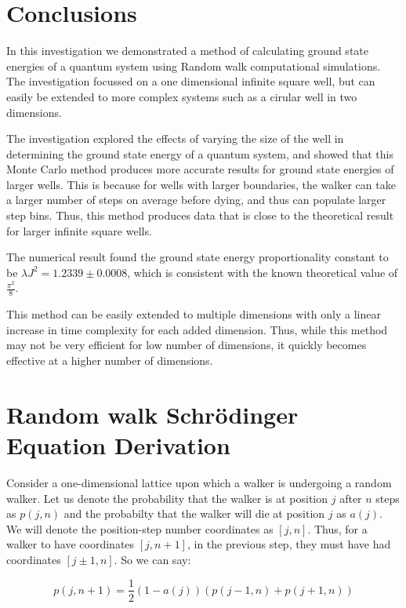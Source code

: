 \documentclass[journal]{IEEEtran}
\begin{document}
\section{Conclusions}

In this investigation we demonstrated a method of calculating ground state
energies of a quantum system using Random walk computational simulations. The
investigation focussed on a one dimensional infinite square well, but can easily
be extended to more complex systems such as a cirular well in two dimensions.

The investigation explored the effects of varying the size of the well in
determining the ground state energy of a quantum system, and showed that this
Monte Carlo method produces more accurate results for ground state energies of
larger wells.  This is because for wells with larger boundaries, the walker can
take a larger number of steps on average before dying, and thus can populate
larger step bins. Thus, this method produces data that is close to the
theoretical result for larger infinite square wells.

The numerical result found the ground state energy proportionality constant to
be $\lambda J^2 = 1.2339 \pm 0.0008$, which is consistent with the known
theoretical value of $\frac{\pi^2}{8}$.

This method can be easily extended to multiple dimensions with only a linear
increase in time complexity for each added dimension. Thus, while this method
may not be very efficient for low number of dimensions, it quickly becomes
effective at a higher number of dimensions.


\pagebreak
\appendices
\section{Random walk Schr\"{o}dinger Equation Derivation}
\label{appendix:derivation}
Consider a one-dimensional lattice upon which a walker is undergoing a random
walker. Let us denote the probability that the walker is at position $j$ after
$n$ steps as $p(j,n)$ and the probabilty that the walker will die at position
$j$ as $a(j)$. We will denote the position-step number coordinates as $[j,
n]$. Thus, for a walker to have coordinates $[j, n+1]$, in the previous step,
they must have had coordinates $[j \pm 1, n]$. So we can say:

\begin{equation}
  \label{eq:probability}
  p(j, n+1) =  \frac{1}{2}(1-a(j))(p(j-1,n) + p(j+1,n))
\end{equation}
\end{document}

